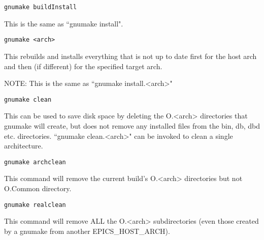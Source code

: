 \begin{description}
\end{description}\begin{verbatim}gnumake buildInstall
\end{verbatim}\begin{description}\item This is the same as ``gnumake install".

\item 

\end{description}\begin{verbatim}gnumake <arch>
\end{verbatim}\begin{description}\item This rebuilds and installs everything that is not up to date first for the host arch and then (if different) for the 
specified target arch.

\item NOTE: This is the same as ``gnumake install.\textless{}arch\textgreater{}"

\item 

\end{description}\begin{verbatim}gnumake clean
\end{verbatim}\begin{description}\item This can be used to save disk space by deleting the O.\textless{}arch\textgreater{} directories that gnumake will create, but does not 
remove any installed files from the bin, db, dbd etc. directories. ``gnumake clean.\textless{}arch\textgreater{}" can be invoked to clean a 
single architecture.

\item 

\end{description}\begin{verbatim}gnumake archclean
\end{verbatim}\begin{description}\item This command will remove the current build's O.\textless{}arch\textgreater{} directories but not O.Common directory.

\item 

\end{description}\begin{verbatim}gnumake realclean
\end{verbatim}\begin{description}\item This command will remove ALL the O.\textless{}arch\textgreater{} subdirectories (even those created by a gnumake from another 
EPICS\_HOST\_ARCH).


\end{description}

